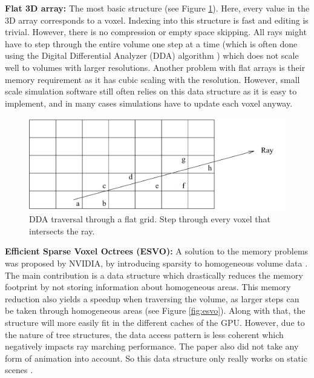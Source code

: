 \noindent\textbf{Flat 3D array:} The most basic structure (see Figure \ref{fig:dda_traversal}). Here, every value in the 3D array corresponds to a voxel. Indexing into this structure is fast and editing is trivial. However, there is no compression or empty space skipping. All rays might have to step through the entire volume one step at a time (which is often done using the Digital Differential Analyzer (DDA) algorithm \cite{amanatides1987fast}) which does not scale well to volumes with larger resolutions. Another problem with flat arrays is their memory requirement as it has cubic scaling with the resolution. However, small scale simulation software still often relies on this data structure as it is easy to implement, and in many cases simulations have to update each voxel anyway.

\begin{figure}[H]
    \centering
    \includegraphics[width=0.9\linewidth]{figures/dda.png}
    \caption{DDA traversal through a flat grid. Step through every voxel that intersects the ray. \cite{amanatides1987fast}}
    \label{fig:dda_traversal}
\end{figure}

\noindent\textbf{Efficient Sparse Voxel Octrees (ESVO):} A solution to the memory problems was proposed by NVIDIA, by introducing sparsity to homogeneous volume data \cite{laine2010efficient}. The main contribution is a data structure which drastically reduces the memory footprint by not storing information about homogeneous areas. This memory reduction also yields a speedup when traversing the volume, as larger steps can be taken through homogeneous areas (see Figure \ref{fig:esvo}). Along with that, the structure will more easily fit in the different caches of the GPU. However, due to the nature of tree structures, the data access pattern is less coherent which negatively impacts ray marching performance. The paper also did not take any form of animation into account. So this data structure only really works on static scenes \cite{JohnLinPerfectEngine}. 

